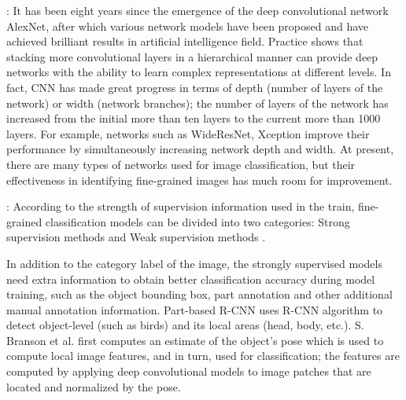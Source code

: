 \documentclass[10pt,twocolumn,letterpaper]{article}
\begin{document}
: It has been eight years since the emergence of the deep convolutional network AlexNet, after which various network models have been proposed and have achieved brilliant results in artificial intelligence field. Practice shows that stacking more convolutional layers in a hierarchical manner can provide deep networks with the ability to learn complex representations at different levels. In fact, CNN has made great progress in terms of depth (number of layers of the network) or width (network branches); the number of layers of the network has increased from the initial more than ten layers to the current more than 1000 layers. For example, networks such as WideResNet\cite{WideResNet}, Xception\cite{Xception} improve their performance by simultaneously increasing network depth and width. At present, there are many types of networks used for image classification, but their effectiveness in identifying fine-grained images has much room for improvement.

: According to the strength of supervision information used in the train, fine-grained classification models can be divided into two categories: Strong supervision methods\cite{2017Look,Zhang2014Part,2014Bird,2015Augmenting} and Weak supervision methods\cite{2015Bilinear,2020Graph,Kim2020,Ji2020Attention,2019Selective,2020WeaklyCVPR,2020Category,8322428} .

In addition to the category label of the image, the strongly supervised models need extra information to obtain better classification accuracy during model training, such as the object bounding box, part annotation and other additional manual annotation information. Part-based R-CNN\cite{Zhang2014Part} uses R-CNN algorithm to detect object-level (such as birds) and its local areas (head, body, etc.). S. Branson et al.\cite{2014Bird} first computes an estimate of the object’s pose which is used to compute local image features, and in turn, used for classification; the features are computed by applying deep convolutional models to image patches that are located and normalized by the pose.
\end{document}

